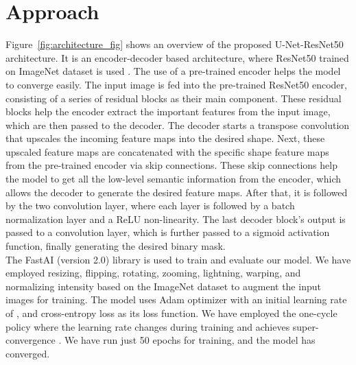\documentclass[sigconf]{acmart-me}
\begin{document}
\section{Approach}
\label{sec:approach}
Figure~\ref{fig:architecture_fig} shows an overview of the proposed U-Net-ResNet50 architecture. It is an encoder-decoder based architecture, where ResNet50 trained on ImageNet dataset \cite{russakovsky2015imagenet} is used . The use of a pre-trained encoder helps the model to converge easily.
The input image is fed into the pre-trained ResNet50 encoder, consisting of a series of residual blocks as their main component. These residual blocks help the encoder extract the important features from the input image, which are then passed to the decoder. The decoder starts a transpose convolution that upscales the incoming feature maps into the desired shape. Next, these upscaled feature maps are concatenated with the specific shape feature maps from the pre-trained encoder via skip connections. These skip connections help the model to get all the low-level semantic information from the encoder, which allows the decoder to generate the desired feature maps. After that, it is followed by the two  convolution layer, where each layer is followed by a batch normalization layer and a ReLU non-linearity. The last decoder block's output is passed to a  convolution layer, which is further passed to a sigmoid activation function, finally generating the desired binary mask.\\
\indent The FastAI (version 2.0) library \cite{docsfast} is used to train and evaluate our model. We have employed resizing, flipping, rotating, zooming, lightning, warping, and normalizing intensity based on the ImageNet dataset to augment the input images for training. The model uses Adam optimizer with an initial learning rate of , and cross-entropy loss as its loss function. We have employed the one-cycle policy where the learning rate changes during training and achieves super-convergence \cite{smith2019super}. We have run just 50 epochs for training, and the model has converged.
\end{document}
